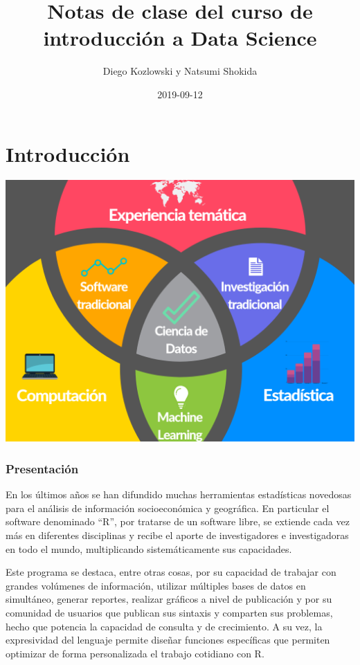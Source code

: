 \documentclass[]{book}
\title{Notas de clase del curso de introducción a Data Science}
\author{Diego Kozlowski y Natsumi Shokida}
\date{2019-09-12}
\begin{document}
\maketitle

{
\setcounter{tocdepth}{1}
\tableofcontents
}
\hypertarget{introduccion}{%
\chapter*{Introducción}\label{introduccion}}

\includegraphics[width=10.41667in,height=\textheight]{img/venn_ds.png}

\hypertarget{presentacion}{%
\subsection*{Presentación}\label{presentacion}}

En los últimos años se han difundido muchas herramientas estadísticas novedosas para el análisis de información socioeconómica y geográfica. En particular el software denominado ``R'', por tratarse de un software libre, se extiende cada vez más en diferentes disciplinas y recibe el aporte de investigadores e investigadoras en todo el mundo, multiplicando sistemáticamente sus capacidades.

Este programa se destaca, entre otras cosas, por su capacidad de trabajar con grandes volúmenes de información, utilizar múltiples bases de datos en simultáneo, generar reportes, realizar gráficos a nivel de publicación y por su comunidad de usuarios que publican sus sintaxis y comparten sus problemas, hecho que potencia la capacidad de consulta y de crecimiento. A su vez, la expresividad del lenguaje permite diseñar funciones específicas que permiten optimizar de forma personalizada el trabajo cotidiano con R.
\end{document}

